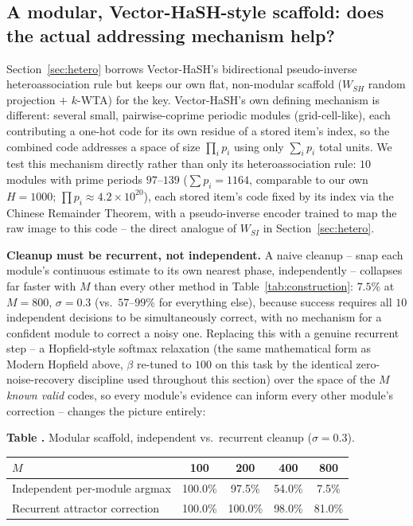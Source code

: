 \documentclass[11pt]{article}
\newcommand{\toprule}{\hline\hline}
\newcommand{\midrule}{\hline}
\newcommand{\bottomrule}{\hline\hline}
\begin{document}
\subsection{A modular, Vector-HaSH-style scaffold: does the actual addressing mechanism help?}
\label{sec:vectorhash-scaffold}

Section~\ref{sec:hetero} borrows Vector-HaSH's bidirectional pseudo-inverse heteroassociation
rule but keeps our own flat, non-modular scaffold ($W_{SH}$ random projection $+$ $k$-WTA) for
the key. Vector-HaSH's own defining mechanism is different: several small, pairwise-coprime
periodic modules (grid-cell-like), each contributing a one-hot code for its own residue of a
stored item's index, so the combined code addresses a space of size $\prod_i p_i$ using only
$\sum_i p_i$ total units. We test this mechanism directly rather than only its heteroassociation
rule: $10$ modules with prime periods $97$--$139$ ($\sum p_i=1164$, comparable to our own
$H{=}1000$; $\prod p_i\approx4.2\times10^{20}$), each stored item's code fixed by its index via
the Chinese Remainder Theorem, with a pseudo-inverse encoder trained to map the raw image to
this code -- the direct analogue of $W_{SI}$ in Section~\ref{sec:hetero}.

\textbf{Cleanup must be recurrent, not independent.} A naive cleanup -- snap each module's
continuous estimate to its own nearest phase, independently -- collapses far faster with $M$
than every other method in Table~\ref{tab:construction}: $7.5\%$ at $M{=}800$, $\sigma{=}0.3$
(vs.\ $57$--$99\%$ for everything else), because success requires all $10$ independent decisions
to be simultaneously correct, with no mechanism for a confident module to correct a noisy one.
Replacing this with a genuine recurrent step -- a Hopfield-style softmax relaxation (the same
mathematical form as Modern Hopfield above, $\beta$ re-tuned to $100$ on this task by the
identical zero-noise-recovery discipline used throughout this section) over the space of the $M$
\emph{known valid} codes, so every module's evidence can inform every other module's correction
-- changes the picture entirely:

\label{tab:vectorhash-recurrence}
\noindent\textbf{Table \thetable.} Modular scaffold, independent vs.\ recurrent cleanup ($\sigma{=}0.3$).
\begin{center}
\begin{tabular}{lcccc}
\toprule
$M$ & 100 & 200 & 400 & 800 \\
\midrule
Independent per-module argmax & 100.0\% & 97.5\% & 54.0\% & 7.5\% \\
Recurrent attractor correction & 100.0\% & 100.0\% & 98.0\% & 81.0\% \\
\bottomrule
\end{tabular}
\end{center}
\end{document}
